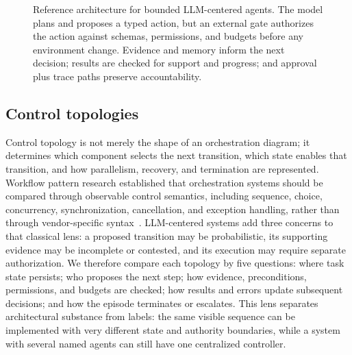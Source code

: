 \begin{figure}[H]

\caption{Reference architecture for bounded LLM-centered agents. The model plans and proposes a typed action, but an external gate authorizes the action against schemas, permissions, and budgets before any environment change. Evidence and memory inform the next decision; results are checked for support and progress; and approval plus trace paths preserve accountability.}
\label{fig:reference-architecture}
\end{figure}

\subsection{Control topologies}

Control topology is not merely the shape of an orchestration diagram; it determines which component selects the next transition, which state enables that transition, and how parallelism, recovery, and termination are represented. Workflow pattern research established that orchestration systems should be compared through observable control semantics, including sequence, choice, concurrency, synchronization, cancellation, and exception handling, rather than through vendor-specific syntax~\cite{vanderAalst2003workflowpatterns}. LLM-centered systems add three concerns to that classical lens: a proposed transition may be probabilistic, its supporting evidence may be incomplete or contested, and its execution may require separate authorization. We therefore compare each topology by five questions: where task state persists; who proposes the next step; how evidence, preconditions, permissions, and budgets are checked; how results and errors update subsequent decisions; and how the episode terminates or escalates. This lens separates architectural substance from labels: the same visible sequence can be implemented with very different state and authority boundaries, while a system with several named agents can still have one centralized controller.

